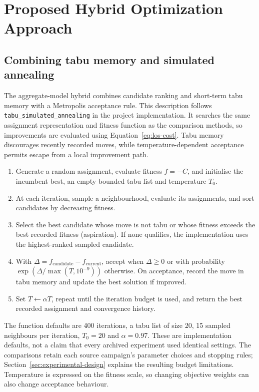 \section{Proposed Hybrid Optimization Approach}
\label{sec:hybrid-approach}

\subsection{Combining tabu memory and simulated annealing}

The aggregate-model hybrid combines candidate ranking and short-term tabu
memory with a Metropolis acceptance rule. This description follows
\texttt{tabu\_simulated\_annealing} in the project implementation. It searches
the same assignment representation and fitness function as the comparison
methods, so improvements are evaluated using Equation~\ref{eq:los-cost}.
Tabu memory discourages recently recorded moves, while temperature-dependent
acceptance permits escape from a local improvement path.

\begin{enumerate}
\item Generate a random assignment, evaluate fitness $f=-C$, and initialise
      the incumbent best, an empty bounded tabu list and temperature $T_0$.
\item At each iteration, sample a neighbourhood, evaluate its assignments,
      and sort candidates by decreasing fitness.
\item Select the best candidate whose move is not tabu or whose fitness
      exceeds the best recorded fitness (aspiration). If none qualifies,
      the implementation uses the highest-ranked sampled candidate.
\item With $\Delta=f_{\mathrm{candidate}}-f_{\mathrm{current}}$, accept when
      $\Delta\geq0$ or with probability
      $\exp(\Delta/\max(T,10^{-9}))$ otherwise. On acceptance, record the
      move in tabu memory and update the best solution if improved.
\item Set $T\leftarrow\alpha T$, repeat until the iteration budget is used,
      and return the best recorded assignment and convergence history.
\end{enumerate}

The function defaults are 400 iterations, a tabu list of size 20, 15 sampled
neighbours per iteration, $T_0=20$ and $\alpha=0.97$. These are implementation
defaults, not a claim that every archived experiment used identical settings.
The comparisons retain each source campaign's parameter choices and stopping
rules; Section~\ref{sec:experimental-design} explains the resulting budget
limitations. Temperature is expressed on the fitness scale, so changing
objective weights can also change acceptance behaviour.

